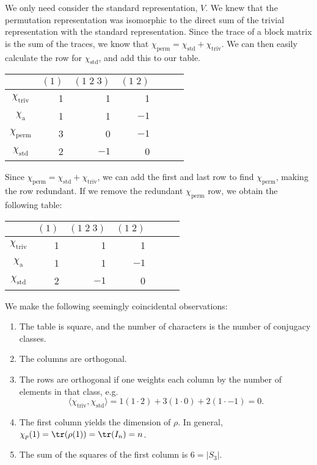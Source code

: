 \begin{ex}
We only need consider the standard representation, $V$. We knew that the permutation representation was isomorphic to the direct sum of the trivial representation with the standard representation. Since the trace of a block matrix is the sum of the traces, we know that $\chi_{\text{perm}}= \chi_{\text{std}}+\chi_{\text{triv}}$. We can then easily calculate the row for $\chi_{\text{std}}$, and add this to our table. 
	\begin{table}[h!]
	\centering
	\begin{tabular}{c|rrrrrr}
	& $(1)$ & $(1\;2\;3)$ & $(1\;2)$ \\ \hline 
	$\chi_{\text{triv}}$ & 1 & 1 & 1 \\
	$\chi_{\text{a}}$ & 1 & 1 & $-1$ \\
	$\chi_{\text{perm}}$ & 3 & 0 & $-1$ \\
	$\chi_{\text{std}}$ & 2 & $-1$ & 0
	\end{tabular}
	\end{table}
Since $\chi_{\text{perm}}= \chi_{\text{std}}+\chi_{\text{triv}}$, we can add the first and last row to find $\chi_\text{perm}$, making the row redundant. If we remove the redundant $\chi_{\text{perm}}$ row, we obtain the following table:
	\begin{table}[h!]
	\centering
	\begin{tabular}{c|rrrrrr}
	& $(1)$ & $(1\;2\;3)$ & $(1\;2)$ \\ \hline 
	$\chi_{\text{triv}}$ & 1 & 1 & 1 \\
	$\chi_{\text{a}}$ & 1 & 1 & $-1$ \\
	$\chi_{\text{std}}$ & 2 & $-1$ & 0
	\end{tabular}
	\end{table}

We make the following seemingly coincidental observations:
	\begin{enumerate}[1.]
	\item The table is square, and the number of characters is the number of conjugacy classes.
	\item The columns are orthogonal.
	\item The rows are orthogonal if one weights each column by the number of elements in that class, e.g.
		\[
		\langle \chi_{\text{triv}}, \chi_{\text{std}} \rangle = 1(1 \cdot 2 ) + 3(1 \cdot 0) + 2(1\cdot -1)=0.
		\]
	\item The first column yields the dimension of $\rho$. In general, $\chi_p(1)=\tr(\rho(1))= \tr(I_n)=n$.
	\item The sum of the squares of the first column is $6=|S_3|$. \xqed
	\end{enumerate} 
\end{ex}























